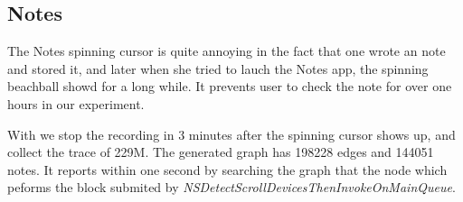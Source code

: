\subsection{Notes}
The Notes spinning cursor is quite annoying in the fact that
one wrote an note and stored it, and later when she tried to
lauch the Notes app, the spinning beachball showd for a long
while. It prevents user to check the note for over one hours
in our experiment.

With \xxx we stop the recording in 3 minutes after the spinning
cursor shows up, and collect the trace of 229M.
The generated graph has 198228 edges and 144051 notes.
It reports within one second by searching the graph that
the node which peforms the block submited by
\textit{NSDetectScrollDevicesThenInvokeOnMainQueue}.

